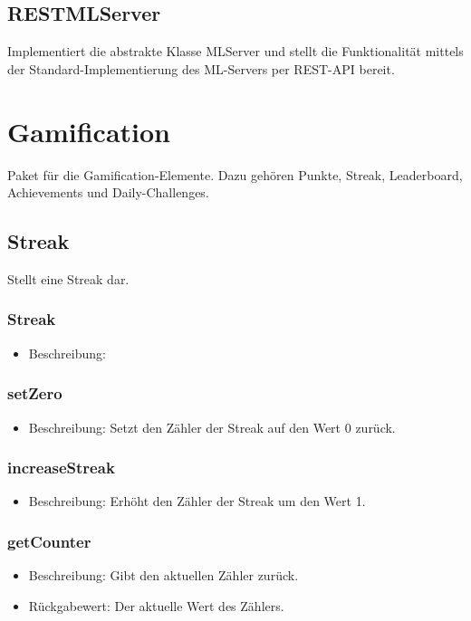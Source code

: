 \documentclass[a4paper]{scrreprt}
\begin{document}
    \subsection{RESTMLServer}
    Implementiert die abstrakte Klasse MLServer und stellt die Funktionalität mittels der Standard-Implementierung des ML-Servers per REST-API bereit.
    
    
     \section{Gamification}
   Paket für die Gamification-Elemente. Dazu gehören Punkte, Streak, Leaderboard, Achievements und Daily-Challenges.
   
   
   \subsection{Streak}
   Stellt eine Streak dar.
   
   \subsubsection{Streak}
   \begin{itemize}
   	  \item Beschreibung:
   \end{itemize}
   \subsubsection{setZero}
   \begin{itemize}
   	\item Beschreibung: Setzt den Zähler der Streak auf den Wert 0 zurück.
   \end{itemize}
   \subsubsection{increaseStreak}
   \begin{itemize}
   	\item Beschreibung: Erhöht den Zähler der Streak um den Wert 1.
   \end{itemize}
   \subsubsection{getCounter}
   \begin{itemize}
   	\item Beschreibung: Gibt den aktuellen Zähler zurück.
   	\item Rückgabewert: Der aktuelle Wert des Zählers.
   \end{itemize}
   
\end{document}
